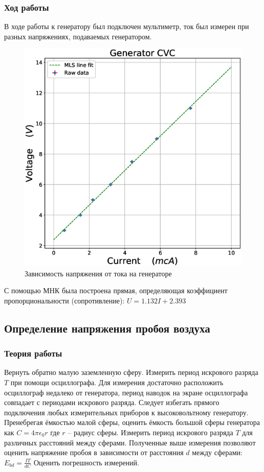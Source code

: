 \documentclass[a4paper,14pt]{extarticle}
\begin{document}
			\subsubsection{Ход работы}
				В ходе работы к генератору был подключен мультиметр, ток был измерен при разных напряжениях, подаваемых генератором.
				\begin{figure}[h]
					\centering
					\includegraphics[width=.80\linewidth]{Lab1_4.eps}
					\caption{Зависимость напряжения от тока на генераторе}
					\label{fig8}
				\end{figure}
				\newpage
				С помощью МНК была построена прямая, определяющая коэффициент пропорциональности (сопротивление): $U = 1.132 I + 2.393$
		\subsection{Определение напряжения пробоя воздуха}
			\subsubsection{Теория работы}
				Вернуть обратно малую заземленную сферу. Измерить период искрового разряда $T$ при помощи осциллографа. Для измерения достаточно расположить осциллограф	недалеко от генератора, период наводок на экране осциллографа совпадает с периодами искрового разряда. Следует избегать прямого подключения любых измерительных приборов к высоковольтному генератору. 
				\newline
				Пренебрегая ёмкостью малой сферы, оценить ёмкость большой сферы генератора как $C = 4 \pi \epsilon_0 r$ где $r$ – радиус сферы. 
				\newline
				Измерить период искрового разряда $T$ для различных расстояний между сферами.
				\newline 
				Полученные выше измерения позволяют оценить напряжение пробоя в зависимости от расстояния $d$ между сферами:
				$E_{bd} = \frac{IT}{dC}$
				\newline
				Оценить погрешность измерений.
\end{document}
